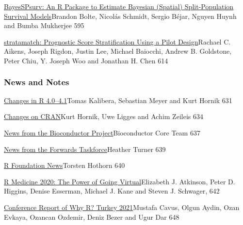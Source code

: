 \href{../../articles/RJ-2021-068}{BayesSPsurv: An R Package to Estimate
Bayesian (Spatial) Split-Population Survival Models}Brandon Bolte,
Nicolás Schmidt, Sergio Béjar, Nguyen Huynh and Bumba Mukherjee 595

\href{../../articles/RJ-2021-063}{stratamatch: Prognostic Score
Stratification Using a Pilot Design}Rachael C. Aikens, Joseph Rigdon,
Justin Lee, Michael Baiocchi, Andrew B. Goldstone, Peter Chiu, Y. Joseph
Woo and Jonathan H. Chen 614

\hypertarget{news-and-notes}{%
\subsubsection{News and Notes}\label{news-and-notes}}

\href{../../news/RJ-2021-1-core}{Changes in R 4.0--4.1}Tomas Kalibera,
Sebastian Meyer and Kurt Hornik 631

\href{../../news/RJ-2021-1-cran}{Changes on CRAN}Kurt Hornik, Uwe Ligges
and Achim Zeileis 634

\href{../../news/RJ-2021-1-bioc}{News from the Bioconductor
Project}Bioconductor Core Team 637

\href{../../news/RJ-2021-1-forwards-news}{News from the Forwards
Taskforce}Heather Turner 639

\href{../../news/RJ-2021-1-foundation}{R Foundation News}Torsten Hothorn
640

\href{../../news/RJ-2021-1-rmed2020}{R Medicine 2020: The Power of Going
Virtual}Elizabeth J. Atkinson, Peter D. Higgins, Denise Esserman,
Michael J. Kane and Steven J. Schwager, 642

\href{../../news/RJ-2021-1-whyr2021}{Conference Report of Why R? Turkey
2021}Mustafa Cavus, Olgun Aydin, Ozan Evkaya, Ozancan Ozdemir, Deniz
Bezer and Ugur Dar 648


